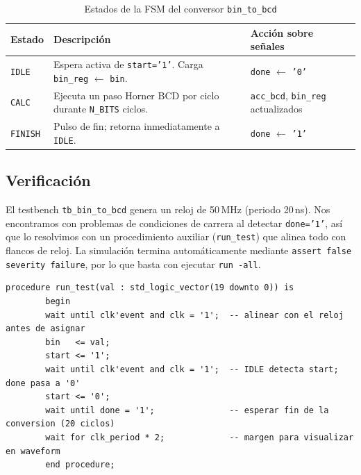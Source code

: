 \documentclass[memoria_final]{subfiles}
\begin{document}
	\begin{table}[H]
		\centering
		\caption{Estados de la FSM del conversor \texttt{bin\_to\_bcd}}
		\begin{tabular}{lll}
			\toprule
			\textbf{Estado} & \textbf{Descripción} & \textbf{Acción sobre señales} \\
			\midrule
			\texttt{IDLE}
			& Espera activa de \texttt{start='1'}.
			Carga \texttt{bin\_reg} $\leftarrow$ \texttt{bin}.
			& \texttt{done} $\leftarrow$ \texttt{'0'} \\[4pt]
			\texttt{CALC}
			& Ejecuta un paso Horner BCD por ciclo
			durante \texttt{N\_BITS} ciclos.
			& \texttt{acc\_bcd}, \texttt{bin\_reg} actualizados \\[4pt]
			\texttt{FINISH}
			& Pulso de fin; retorna inmediatamente a \texttt{IDLE}.
			& \texttt{done} $\leftarrow$ \texttt{'1'} \\
			\bottomrule
		\end{tabular}
		\label{tab:fsm}
	\end{table}
	
	\FloatBarrier
	
	\subsection{Verificación}
	
	El testbench \texttt{tb\_bin\_to\_bcd} genera un reloj de 50\,MHz (periodo 20\,ns). Nos encontramos con problemas de condiciones de carrera al detectar \texttt{done='1'}, así que lo resolvimos con un procedimiento auxiliar (\texttt{run\_test}) que alinea todo con flancos de reloj. La simulación termina automáticamente mediante \texttt{assert false severity failure}, por lo que basta con ejecutar \texttt{run -all}.
	
	\begin{lstlisting}[caption={Procedimiento auxiliar \texttt{run\_test} del testbench secuencial}]
		procedure run_test(val : std_logic_vector(19 downto 0)) is
		begin
		wait until clk'event and clk = '1';  -- alinear con el reloj antes de asignar
		bin   <= val;
		start <= '1';
		wait until clk'event and clk = '1';  -- IDLE detecta start; done pasa a '0'
		start <= '0';
		wait until done = '1';               -- esperar fin de la conversion (20 ciclos)
		wait for clk_period * 2;             -- margen para visualizar en waveform
		end procedure;
	\end{lstlisting}
	
\end{document}
